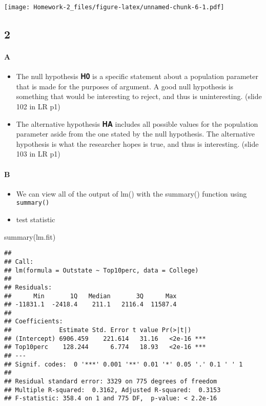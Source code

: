 \documentclass[
]{article}
\newenvironment{Shaded}{\begin{snugshade}}{\end{snugshade}}
\newcommand{\FunctionTok}[1]{\textcolor[rgb]{0.00,0.00,0.00}{#1}}
\newcommand{\NormalTok}[1]{#1}
\providecommand{\tightlist}{%
  \setlength{\itemsep}{0pt}\setlength{\parskip}{0pt}}
\begin{document}
\texttt{[image: Homework-2\_files/figure-latex/unnamed-chunk-6-1.pdf]}

\hypertarget{section-1}{%
\subsection{2}\label{section-1}}

\hypertarget{a-1}{%
\paragraph{A}\label{a-1}}

\begin{itemize}
\tightlist
\item
  The null hypothesis 𝐇𝟎 is a specific statement about a population
  parameter that is made for the purposes of argument. A good null
  hypothesis is something that would be interesting to reject, and thus
  is uninteresting. (slide 102 in LR p1)
\item
  The alternative hypothesis 𝐇𝐀 includes all possible values for the
  population parameter aside from the one stated by the null hypothesis.
  The alternative hypothesis is what the researcher hopes is true, and
  thus is interesting. (slide 103 in LR p1)
\end{itemize}

\hypertarget{b-1}{%
\paragraph{B}\label{b-1}}

\begin{itemize}
\tightlist
\item
  We can view all of the output of lm() with the summary() function
  using \texttt{summary()}
\item
  test statistic
\end{itemize}

\begin{Shaded}
\begin{Highlighting}[]
\FunctionTok{summary}\NormalTok{(lm.fit)}
\end{Highlighting}
\end{Shaded}

\begin{verbatim}
## 
## Call:
## lm(formula = Outstate ~ Top10perc, data = College)
## 
## Residuals:
##      Min       1Q   Median       3Q      Max 
## -11831.1  -2418.4    211.1   2116.4  11587.4 
## 
## Coefficients:
##             Estimate Std. Error t value Pr(>|t|)    
## (Intercept) 6906.459    221.614   31.16   <2e-16 ***
## Top10perc    128.244      6.774   18.93   <2e-16 ***
## ---
## Signif. codes:  0 '***' 0.001 '**' 0.01 '*' 0.05 '.' 0.1 ' ' 1
## 
## Residual standard error: 3329 on 775 degrees of freedom
## Multiple R-squared:  0.3162, Adjusted R-squared:  0.3153 
## F-statistic: 358.4 on 1 and 775 DF,  p-value: < 2.2e-16
\end{verbatim}
\end{document}
